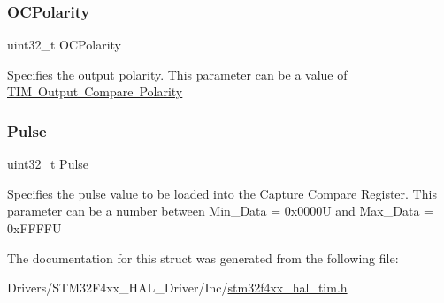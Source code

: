 \subsubsection{\texorpdfstring{O\+C\+Polarity}{OCPolarity}}
{\footnotesize\ttfamily uint32\+\_\+t O\+C\+Polarity}

Specifies the output polarity. This parameter can be a value of \mbox{\hyperlink{group___t_i_m___output___compare___polarity}{T\+IM Output Compare Polarity}} \mbox{\label{struct_t_i_m___o_c___init_type_def_a5251c3bce4ca5baf013bc0ace0865a4c}} 
\subsubsection{\texorpdfstring{Pulse}{Pulse}}
{\footnotesize\ttfamily uint32\+\_\+t Pulse}

Specifies the pulse value to be loaded into the Capture Compare Register. This parameter can be a number between Min\+\_\+\+Data = 0x0000U and Max\+\_\+\+Data = 0x\+F\+F\+F\+FU 

The documentation for this struct was generated from the following file\+:\begin{DoxyCompactItemize}
\item 
Drivers/\+S\+T\+M32\+F4xx\+\_\+\+H\+A\+L\+\_\+\+Driver/\+Inc/\mbox{\hyperlink{stm32f4xx__hal__tim_8h}{stm32f4xx\+\_\+hal\+\_\+tim.\+h}}\end{DoxyCompactItemize}

